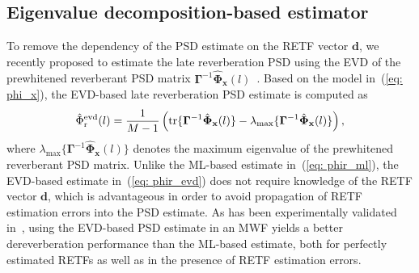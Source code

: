\documentclass{article}
\begin{document}
\subsection{Eigenvalue decomposition-based estimator}
\label{sec: evd_psd}
To remove the dependency of the PSD estimate on the RETF vector $\mathbf{d}$, we recently proposed to estimate the late reverberation PSD using the EVD of the prewhitened reverberant PSD matrix $\boldsymbol{\Gamma}^{-1}\hat{\boldsymbol{\Phi}}_{\mathbf{x}}(l)$~\cite{Kodrasi_ICASSP_2017}.
Based on the model in~(\ref{eq: phi_x}), the EVD-based late reverberation PSD estimate is computed as
\begin{equation}
  \label{eq: phir_evd}
  \hat{\Phi}^{\rm evd}_{\rm r}(l) = \frac{1}{M-1} \left( {\rm tr} \{ \boldsymbol{\Gamma}^{-1}\hat{\boldsymbol{\Phi}}_{\mathbf{x}}(l) \} - \lambda_{\max}\{ \boldsymbol{\Gamma}^{-1}\hat{\boldsymbol{\Phi}}_{\mathbf{x}}(l) \} \right),
\end{equation}
where $\lambda_{\max}\{\boldsymbol{\Gamma}^{-1}\hat{\boldsymbol{\Phi}}_{\mathbf{x}}(l) \}$ denotes the maximum eigenvalue of the prewhitened reverberant PSD matrix.
Unlike the ML-based estimate in~(\ref{eq: phir_ml}), the EVD-based estimate in~(\ref{eq: phir_evd}) does not require knowledge of the RETF vector $\mathbf{d}$, which is advantageous in order to avoid propagation of RETF estimation errors into the PSD estimate.
As has been experimentally validated in~\cite{Kodrasi_ICASSP_2017}, using the EVD-based PSD estimate in an MWF yields a better dereverberation performance than the ML-based estimate, both for perfectly estimated RETFs as well as in the presence of RETF estimation errors.
\end{document}
